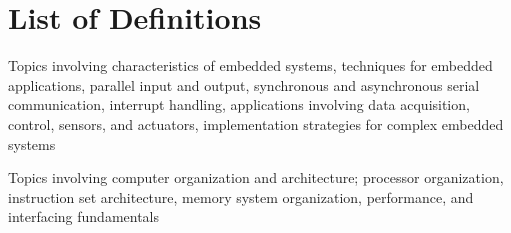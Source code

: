 
\chapter*{List of Definitions}

\begin{definition} 
	Topics involving characteristics of embedded systems, techniques for embedded applications, parallel input and output, synchronous and asynchronous serial communication, interrupt handling, applications involving data acquisition, control, sensors, and actuators, implementation strategies for complex embedded systems \cite[p.~118]{cec2016}
\end{definition}

\begin{definition} 
	Topics involving computer organization and architecture; processor organization, instruction set architecture, memory system organization, performance, and interfacing fundamentals\cite[p.~118]{cec2016}
\end{definition}